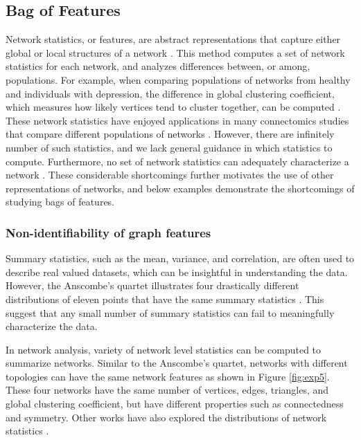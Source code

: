 \subsection{Bag of Features}\label{sec:bag-of-features}
Network statistics, or features, are abstract representations that capture either global or local structures of a network \citep{priebe_coppersmith_rukhin_2010,mhembere2013computing}. This method computes a set of network statistics for each network, and analyzes differences between, or among, populations. For example, when comparing populations of networks from healthy and individuals with depression, the difference in global clustering coefficient, which measures how likely vertices tend to cluster together, can be computed \citep{Bullmore2009-yj}. These network statistics have enjoyed applications in many connectomics studies that compare different populations of networks \citep{bullmore2011brain, ghoshdastidar2017two}. However, there are infinitely number of such statistics, and we lack general guidance in which statistics to compute. Furthermore, no set of network statistics can adequately characterize a network \citep{chen2018same,matejka2017same}. These considerable shortcomings further motivates the use of other representations of networks, and below examples demonstrate the shortcomings of studying bags of features.

\subsubsection{Non-identifiability of graph features}
Summary statistics, such as the mean, variance, and correlation, are often used to describe real valued datasets, which can be insightful in understanding the data. However, the Anscombe's quartet illustrates four drastically different distributions of eleven points that have the same summary statistics \citep{anscombe1973graphs}. This suggest that any small number of summary statistics can fail to meaningfully characterize the data. 

In network analysis, variety of network level statistics can be computed to summarize networks. Similar to the Anscombe's quartet, networks with different topologies can have the same network features as shown in Figure \ref{fig:exp5}. These four networks have the same number of vertices, edges, triangles, and global clustering coefficient, but have different properties such as connectedness and symmetry. Other works have also explored the distributions of network statistics \citep{chen2018same,matejka2017same}. 

